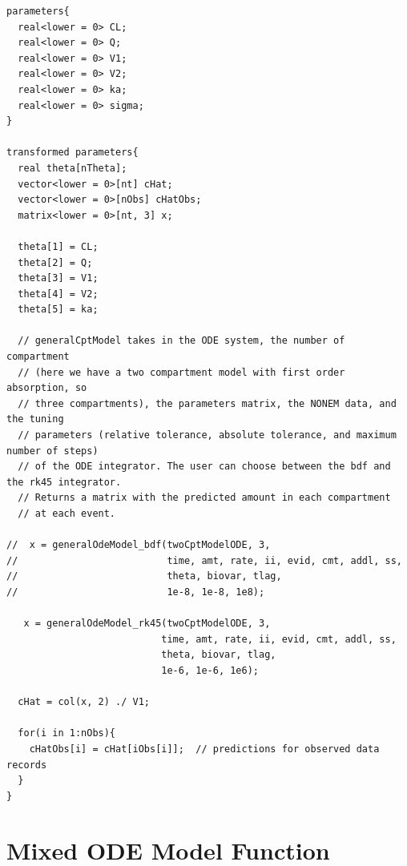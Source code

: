 \documentclass[11pt, reqno, oneside]{amsbook}
\numberwithin{equation}{chapter}
\numberwithin{figure}{chapter}
\numberwithin{table}{chapter}
\theoremstyle{remark}
\begin{document}
\begin{verbatim}
parameters{
  real<lower = 0> CL;
  real<lower = 0> Q;
  real<lower = 0> V1;
  real<lower = 0> V2;
  real<lower = 0> ka;
  real<lower = 0> sigma;
}

transformed parameters{
  real theta[nTheta];
  vector<lower = 0>[nt] cHat;
  vector<lower = 0>[nObs] cHatObs;
  matrix<lower = 0>[nt, 3] x; 

  theta[1] = CL;
  theta[2] = Q;
  theta[3] = V1;
  theta[4] = V2;
  theta[5] = ka;

  // generalCptModel takes in the ODE system, the number of compartment 
  // (here we have a two compartment model with first order absorption, so
  // three compartments), the parameters matrix, the NONEM data, and the tuning
  // parameters (relative tolerance, absolute tolerance, and maximum number of steps)
  // of the ODE integrator. The user can choose between the bdf and the rk45 integrator.
  // Returns a matrix with the predicted amount in each compartment 
  // at each event.

//  x = generalOdeModel_bdf(twoCptModelODE, 3,
//                          time, amt, rate, ii, evid, cmt, addl, ss,
//                          theta, biovar, tlag,
//                          1e-8, 1e-8, 1e8);

   x = generalOdeModel_rk45(twoCptModelODE, 3,
                           time, amt, rate, ii, evid, cmt, addl, ss,
                           theta, biovar, tlag,
                           1e-6, 1e-6, 1e6);

  cHat = col(x, 2) ./ V1;

  for(i in 1:nObs){
    cHatObs[i] = cHat[iObs[i]];  // predictions for observed data records
  }
}
\end{verbatim}

\section{Mixed ODE Model Function}
\label{sec:orgc8b2232}
\label{org84b7ad9}
\end{document}
